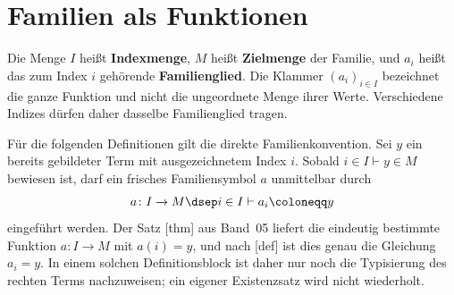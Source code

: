 \documentclass[main.tex]{subfiles}
\begin{document}
\section{Familien als Funktionen}


Die Menge \(I\) heißt \textbf{Indexmenge}, \(M\) heißt \textbf{Zielmenge}
der Familie, und \(a_i\) heißt das zum Index \(i\) gehörende
\textbf{Familienglied}. Die Klammer \((a_i)_{i\in I}\) bezeichnet die ganze
Funktion und nicht die ungeordnete Menge ihrer Werte. Verschiedene Indizes
dürfen daher dasselbe Familienglied tragen.

Für die folgenden Definitionen gilt die direkte Familienkonvention. Sei
\(y\) ein bereits gebildeter Term mit ausgezeichnetem Index \(i\). Sobald
\(i\in I\vdash y\in M\) bewiesen ist, darf ein frisches Familiensymbol \(a\)
unmittelbar durch
\[
  a\colon I\to M\dsep i\in I\vdash a_i\coloneqq y
\]
eingeführt werden. Der Satz
[thm] aus Band~05 liefert die
eindeutig bestimmte Funktion \(a\colon I\to M\) mit \(a(i)=y\), und nach
[def] ist dies genau die Gleichung \(a_i=y\).
In einem solchen Definitionsblock ist daher nur noch die Typisierung des
rechten Terms nachzuweisen; ein eigener Existenzsatz wird nicht wiederholt.

\begin{tabproofsplitwide}
  \closeproofpartwide
\end{tabproofsplitwide}

\begin{tabproofsplitwide}
  \closeproofpartwide
\end{tabproofsplitwide}
\end{document}

